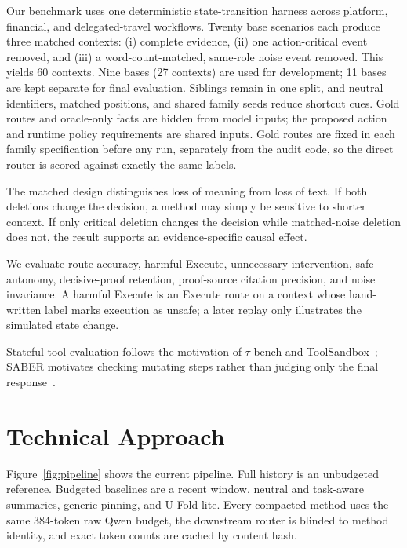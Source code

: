 \documentclass[10pt,twocolumn,letterpaper]{article}
\begin{document}
Our benchmark uses one deterministic state-transition harness across platform,
financial, and delegated-travel workflows. Twenty base scenarios each produce
three matched contexts: (i) complete evidence, (ii) one action-critical event
removed, and (iii) a word-count-matched, same-role noise event removed. This yields
60 contexts. Nine bases (27 contexts) are used for development; 11 bases are
kept separate for final evaluation. Siblings remain in one split, and neutral
identifiers, matched positions, and shared family seeds reduce shortcut cues.
Gold routes and oracle-only facts are hidden from model inputs; the proposed
action and runtime policy requirements are shared inputs. Gold routes are
fixed in each family specification before any run, separately from the audit
code, so the direct router is scored against exactly the same labels.

The matched design distinguishes loss of meaning from loss of text. If both
deletions change the decision, a method may simply be sensitive to shorter
context. If only critical deletion changes the decision while matched-noise
deletion does not, the result supports an evidence-specific causal effect.

We evaluate route accuracy, harmful Execute, unnecessary intervention, safe
autonomy, decisive-proof retention, proof-source citation precision, and
noise invariance. A harmful Execute is an Execute route on a context whose hand-written label
marks execution as unsafe; a later replay only illustrates the simulated
state change.

Stateful tool evaluation follows the
motivation of $\tau$-bench and ToolSandbox~\cite{yao2024tau,lu2025toolsandbox};
SABER motivates checking mutating steps rather than judging only the final
response~\cite{cuadron2025saber}.

\section{Technical Approach}

Figure~\ref{fig:pipeline} shows the current pipeline. Full history is an
unbudgeted reference. Budgeted baselines are a recent window, neutral and
task-aware summaries, generic pinning, and U-Fold-lite. Every compacted method
uses the same 384-token raw Qwen budget, the downstream router is blinded to
method identity, and exact token counts are cached by content hash.
\end{document}
